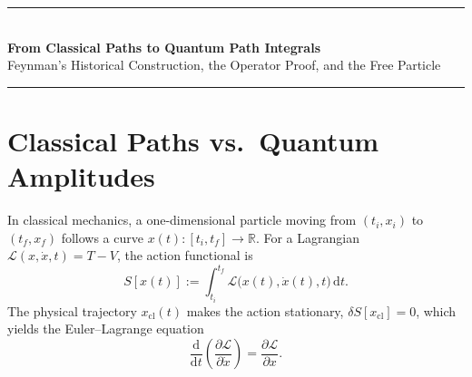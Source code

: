\documentclass[11pt,a4paper]{article}
\newcommand{\dd}{\mathrm{d}}
\newcommand{\Lag}{\mathcal{L}}
\newcommand{\xcl}{x_{\mathrm{cl}}}
\begin{document}
\thispagestyle{plain}
\begin{center}
    {\color{pathBlue}\rule{\textwidth}{1.5pt}}\\[0.75em]
    {\LARGE\bfseries From Classical Paths to Quantum Path Integrals}\\[0.35em]
    {\normalsize\color{slateSub} Feynman's Historical Construction, the Operator Proof, and the Free Particle}\\[0.55em]
    {\color{ruleGray}\rule{\textwidth}{0.7pt}}
\end{center}

{\small\setlength{\parskip}{0.12em}\tableofcontents}
\vspace{0.4em}

\section[Classical Paths vs.\ Quantum Amplitudes]{Classical Paths vs.\ Quantum Amplitudes}
\label{sec:guiding}

In classical mechanics, a one-dimensional particle moving from $(t_i, x_i)$ to $(t_f, x_f)$ follows a curve $x(t):[t_i,t_f]\to\mathbb{R}$. For a Lagrangian $\Lag(x,\dot x,t)=T-V$, the action functional is
\begin{equation}
    S[x(t)] := \int_{t_i}^{t_f} \Lag\bigl(x(t),\dot x(t),t\bigr)\,\dd t.
\end{equation}
The physical trajectory $\xcl(t)$ makes the action stationary, $\delta S[\xcl]=0$, which yields the Euler--Lagrange equation
\begin{equation}
    \frac{\dd}{\dd t}\!\left(\frac{\partial\Lag}{\partial\dot x}\right) = \frac{\partial\Lag}{\partial x}.
    \label{eq:euler-lagrange}
\end{equation}
\end{document}
